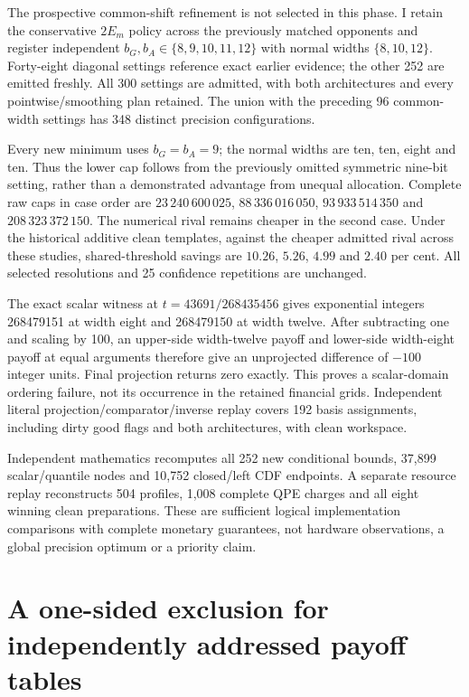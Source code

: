 \documentclass[11pt]{article}
\begin{document}
The prospective common-shift refinement is not selected in this phase.
I retain the conservative $2E_m$ policy across the previously matched
opponents and register independent $b_G,b_A\in\{8,9,10,11,12\}$ with
normal widths $\{8,10,12\}$. Forty-eight diagonal settings reference exact
earlier evidence; the other 252 are emitted freshly. All 300 settings
are admitted, with both architectures and every pointwise/smoothing plan
retained. The union with the preceding 96 common-width settings has 348
distinct precision configurations.

Every new minimum uses $b_G=b_A=9$; the normal widths are ten, ten,
eight and ten. Thus the lower cap follows from the previously omitted
symmetric nine-bit setting, rather than a demonstrated advantage from
unequal allocation. Complete raw caps in case order are
$23\,240\,600\,025$, $88\,336\,016\,050$,
$93\,933\,514\,350$ and $208\,323\,372\,150$.
The numerical rival remains cheaper in the second case. Under the historical additive clean templates, against the
cheaper admitted rival across these studies, shared-threshold savings
are $10.26$, $5.26$, $4.99$ and $2.40$ per cent. All selected resolutions
and 25 confidence repetitions are unchanged.

The exact scalar witness at $t=43691/268435456$ gives exponential
integers 268479151 at width eight and 268479150 at width twelve.
After subtracting one and scaling by 100, an upper-side width-twelve
payoff and lower-side width-eight payoff at equal arguments therefore
give an unprojected difference of $-100$ integer units. Final projection
returns zero exactly. This proves a scalar-domain ordering failure,
not its occurrence in the retained financial grids. Independent literal
projection/comparator/inverse replay covers 192 basis assignments,
including dirty good flags and both architectures, with clean workspace.

Independent mathematics recomputes all 252 new conditional bounds,
37,899 scalar/quantile nodes and 10,752 closed/left CDF endpoints.
A separate resource replay reconstructs 504 profiles, 1,008 complete
QPE charges and all eight winning clean preparations. These are sufficient
logical implementation comparisons with complete monetary guarantees,
not hardware observations, a global precision optimum or a priority claim.

\section{A one-sided exclusion for independently addressed payoff tables}
\label{sec:raw-asymmetric-high-width-exclusion}
\end{document}
